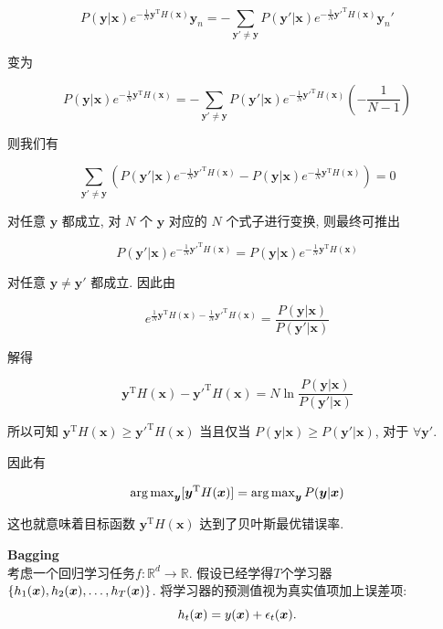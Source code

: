 \documentclass[answers]{exam}  %
\begin{document}
\begin{questions}
\begin{solution}
\begin{enumerate}
            $$
              P(\bm{y}|\bm{x})e^{-\frac{1}{N}\bm{y}^{\mathrm{T}}H(\bm{x})}\bm{y}_{n} = - \sum_{\bm{y}' \neq \bm{y}}P(\bm{y}'|\bm{x})e^{-\frac{1}{N}\bm{y}'^{\mathrm{T}}H(\bm{x})}\bm{y}_{n}'
            $$

            变为

            $$
              P(\bm{y}|\bm{x})e^{-\frac{1}{N}\bm{y}^{\mathrm{T}}H(\bm{x})} = - \sum_{\bm{y}' \neq \bm{y}}P(\bm{y}'|\bm{x})e^{-\frac{1}{N}\bm{y}'^{\mathrm{T}}H(\bm{x})}(-\frac{1}{N-1})
            $$

            则我们有

            $$
              \sum_{\bm{y}' \neq \bm{y}}(P(\bm{y}'|\bm{x})e^{-\frac{1}{N}\bm{y}'^{\mathrm{T}}H(\bm{x})} - P(\bm{y}|\bm{x})e^{-\frac{1}{N}\bm{y}^{\mathrm{T}}H(\bm{x})}) = 0
            $$

            对任意 $\bm{y}$ 都成立, 对 $N$ 个 $\bm{y}$ 对应的 $N$ 个式子进行变换, 则最终可推出

            $$
              P(\bm{y}'|\bm{x})e^{-\frac{1}{N}\bm{y}'^{\mathrm{T}}H(\bm{x})} = P(\bm{y}|\bm{x})e^{-\frac{1}{N}\bm{y}^{\mathrm{T}}H(\bm{x})}
            $$

            对任意 $\bm{y} \neq \bm{y}'$ 都成立. 因此由

            $$
              e^{\frac{1}{N}\bm{y}^{\mathrm{T}}H(\bm{x})-\frac{1}{N}\bm{y}'^{\mathrm{T}}H(\bm{x})} = \frac{P(\bm{y}|\bm{x})}{P(\bm{y}'|\bm{x})}
            $$

            解得

            $$
              \bm{y}^{\mathrm{T}}H(\bm{x})-\bm{y}'^{\mathrm{T}}H(\bm{x}) = N \ln \frac{P(\bm{y}|\bm{x})}{P(\bm{y}'|\bm{x})}
            $$

            所以可知 $\bm{y}^{\mathrm{T}}H(\bm{x}) \ge \bm{y}'^{\mathrm{T}}H(\bm{x})$ 当且仅当 $P(\bm{y}|\bm{x}) \ge P(\bm{y}'|\bm{x})$, 对于 $\forall \bm{y}'$.

            因此有

            $$
              \operatorname{arg\,max}_{\bm{y}}[\bm{y}^{\mathrm{T}}H(\bm{x})] = \operatorname{arg\,max}_{\bm{y}}P(\bm{y}|\bm{x})
            $$

            这也就意味着目标函数 $\bm{y}^{\mathrm{T}}H(\bm{x})$ 达到了贝叶斯最优错误率.
    \end{enumerate}
  \end{solution}

  \question [20] \textbf{Bagging} \\
  考虑一个回归学习任务$f:\mathbb{R}^d \rightarrow \mathbb{R}$. 假设已经学得$T$个学习器$\{h_1({\boldsymbol{x}}), h_2({\boldsymbol{x}}), \dots, h_T({\boldsymbol{x}})\}$. 将学习器的预测值视为真实值项加上误差项:
  \begin{equation}
    h_t({\boldsymbol{x}})=y({\boldsymbol{x}})+\epsilon_t({\boldsymbol{x}}).
  \end{equation}


\end{questions}
\end{document}
